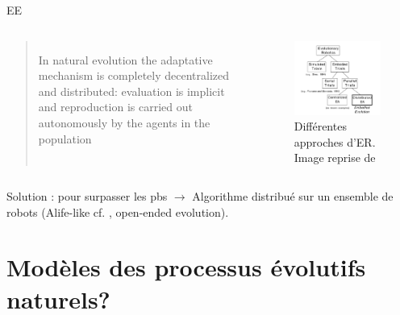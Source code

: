 \documentclass[8pt]{beamer}
\begin{document}
\begin{frame}{EE}
	\begin{columns}
		\begin{quote}
			In natural evolution the adaptative mechanism is completely decentralized and distributed: evaluation is implicit and reproduction is carried out autonomously by the agents in the population\\
			\cite[p. 2]{watson02embodiedevolutiondistributingevolutionaryalgorithmpopulationrobots}
		\end{quote}

		\begin{figure}
			\centering
			\includegraphics[width=.9\textwidth]{images/erTree.png}
			\caption{Différentes approches d'ER. Image reprise de \cite{watson02embodiedevolutiondistributingevolutionaryalgorithmpopulationrobots}}\label{fig:erTree}
		\end{figure}
	\end{columns}

	\begin{block}{Solution}
		\cite{watson02embodiedevolutiondistributingevolutionaryalgorithmpopulationrobots}: pour surpasser les pbs $\rightarrow$ Algorithme distribué sur un ensemble de robots (Alife-like cf. \cite{ray91anapproachtothesynthesisoflife}, open-ended evolution). 
	\end{block}

\end{frame}


\section{Modèles des processus évolutifs naturels?}
\end{document}
